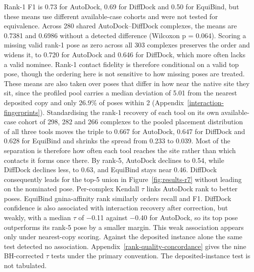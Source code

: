 Rank-1 F1 is 0.73 for AutoDock, 0.69 for DiffDock and 0.50 for EquiBind, but these means use different available-case cohorts and were not tested for equivalence. Across 280 shared AutoDock--DiffDock complexes, the means are 0.7381 and 0.6986 without a detected difference (Wilcoxon p = 0.064). Scoring a missing valid rank-1 pose as zero across all 303 complexes preserves the order and widens it, to 0.720 for AutoDock and 0.646 for DiffDock, which more often lacks a valid nominee. Rank-1 contact fidelity is therefore conditional on a valid top pose, though the ordering here is not sensitive to how missing poses are treated. These means are also taken over poses that differ in how near the native site they sit, since the profiled pool carries a median deviation of 5.01\angstrom{} from the nearest deposited copy and only 26.9\% of poses within 2\angstrom{} (Appendix~\ref{interaction-fingerprints}). Standardising the rank-1 recovery of each tool on its own available-case cohort of 298, 282 and 266 complexes to the pooled placement distribution of all three tools moves the triple to 0.667 for AutoDock, 0.647 for DiffDock and 0.628 for EquiBind and shrinks the spread from 0.233 to 0.039. Most of the separation is therefore how often each tool reaches the site rather than which contacts it forms once there. By rank-5, AutoDock declines to 0.54, while DiffDock declines less, to 0.63, and EquiBind stays near 0.46. DiffDock consequently leads for the top-5 union in Figure~\ref{fig:results-r7} without leading on the nominated pose. Per-complex Kendall \ensuremath{\tau} links AutoDock rank to better poses. EquiBind gnina-affinity rank similarly orders recall and F1. DiffDock confidence is also associated with interaction recovery after correction, but weakly, with a median \ensuremath{\tau} of \ensuremath{-}0.11 against \ensuremath{-}0.40 for AutoDock, so its top pose outperforms its rank-5 pose by a smaller margin. This weak association appears only under nearest-copy scoring. Against the deposited instance alone the same test detected no association. Appendix~\ref{rank-quality-concordance} gives the nine BH-corrected \ensuremath{\tau} tests under the primary convention. The deposited-instance test is not tabulated.

